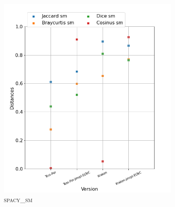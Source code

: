 \begin{figure}[H]
\begin{minipage}{6cm}
\begin{subfigure}{0.89\textwidth}
  \label{fig: }
  \end{subfigure}
  \end{minipage}
  \begin{minipage}{6cm}
  \begin{subfigure}{0.89\textwidth}
  \includegraphics[width=.89\textwidth]{IMAGES/ELTeC_DISTANCES_spaCy3.5.1/DINIZ-graph-dist-spaCy3.5.1-sm.png} 
  \caption{\textsc{spacy\_sm}}
  \label{fig:}
  \end{subfigure}
    \end{minipage}
  \begin{minipage}{6cm}
  \begin{subfigure}{0.89\textwidth}

\end{subfigure}
\end{minipage}
\end{figure}
